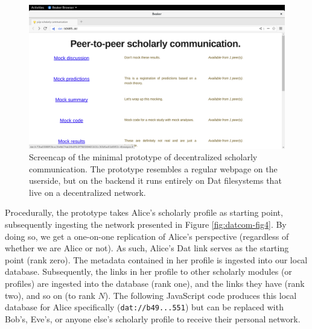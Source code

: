 \documentclass[a5paper]{book}
\begin{document}
\begin{figure}[h]

{\centering \includegraphics[width=1\linewidth]{assets/figures/datcom-fig5} 

}

\caption{Screencap of the minimal prototype of decentralized scholarly communication. The prototype resembles a regular webpage on the userside, but on the backend it runs entirely on Dat filesystems that live on a decentralized network.}\label{fig:datcom-fig5}
\end{figure}

Procedurally, the prototype takes Alice's scholarly profile as starting
point, subsequently ingesting the network presented in Figure
\ref{fig:datcom-fig4}. By doing so, we get a one-on-one replication of
Alice's perspective (regardless of whether we are Alice or not). As
such, Alice's Dat link serves as the starting point (rank zero). The
metadata contained in her profile is ingested into our local database.
Subsequently, the links in her profile to other scholarly modules (or
profiles) are ingested into the database (rank one), and the links they
have (rank two), and so on (to rank \(N\)). The following JavaScript
code produces this local database for Alice specifically
(\texttt{dat://b49...551}) but can be replaced with Bob's, Eve's, or
anyone else's scholarly profile to receive their personal network.
\end{document}
